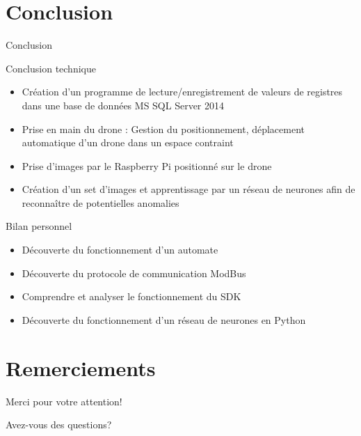 \section{Conclusion}
    \begin{frame}[allowframebreaks]{Conclusion}
        \begin{alertblock}{Conclusion technique}
            \begin{itemize}
                [triangle]
                \item Création d'un programme de lecture/enregistrement de valeurs de registres dans une base de données MS SQL Server 2014
                \item Prise en main du drone : Gestion du positionnement, déplacement automatique d'un drone dans un espace contraint
                \item Prise d'images par le Raspberry Pi positionné sur le drone
                \item Création d'un set d'images et apprentissage par un réseau de neurones afin de reconnaître de potentielles anomalies
            \end{itemize}
        \end{alertblock}
        
        \begin{alertblock}{Bilan personnel}
            \begin{itemize}
                [triangle]
                \item Découverte du fonctionnement d'un automate
                \item Découverte du protocole de communication ModBus
                \item Comprendre et analyser le fonctionnement du SDK
                \item Découverte du fonctionnement d'un réseau de neurones en Python
            \end{itemize}
        \end{alertblock}
    \end{frame}
%
\section*{Remerciements}
	\begin{frame}{}
		\begin{center}
		{\Huge Merci pour votre attention!}

		\vspace{1cm}
		Avez-vous des questions?
		\end{center}
	\end{frame}
%
